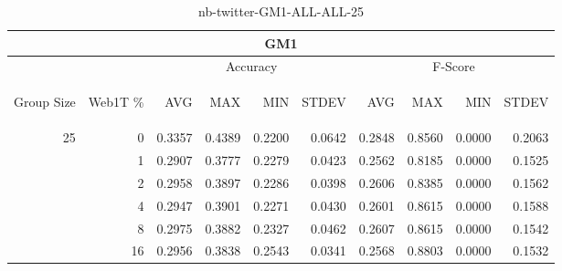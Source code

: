 \begin{center}
\begin{table}[htbp]
\begin{center}
\begin{tabular}{ | r | r | r | r | r | r | r | r | r | r |}
\hline
\multicolumn{10}{|c|}{GM1}\\
\hline
 & & \multicolumn{4}{|c|}{Accuracy} & \multicolumn{4}{|c|}{F-Score}\\ \cline{3-10}
\begin{sideways}Group Size\end{sideways} & \begin{sideways}Web1T \%\end{sideways} & \begin{sideways}AVG\end{sideways} & \begin{sideways}MAX\end{sideways} & \begin{sideways}MIN\end{sideways} & \begin{sideways}STDEV\end{sideways} & \begin{sideways}AVG\end{sideways} & \begin{sideways}MAX\end{sideways} & \begin{sideways}MIN\end{sideways} & \begin{sideways}STDEV\end{sideways}\\
\hline
\multirow{5}{*}{25}
 & 0 & 0.3357 & 0.4389 & 0.2200 & 0.0642 & 0.2848 & 0.8560 & 0.0000 & 0.2063\\ \cline{2-10}
 & 1 & 0.2907 & 0.3777 & 0.2279 & 0.0423 & 0.2562 & 0.8185 & 0.0000 & 0.1525\\ \cline{2-10}
 & 2 & 0.2958 & 0.3897 & 0.2286 & 0.0398 & 0.2606 & 0.8385 & 0.0000 & 0.1562\\ \cline{2-10}
 & 4 & 0.2947 & 0.3901 & 0.2271 & 0.0430 & 0.2601 & 0.8615 & 0.0000 & 0.1588\\ \cline{2-10}
 & 8 & 0.2975 & 0.3882 & 0.2327 & 0.0462 & 0.2607 & 0.8615 & 0.0000 & 0.1542\\ \cline{2-10}
 & 16 & 0.2956 & 0.3838 & 0.2543 & 0.0341 & 0.2568 & 0.8803 & 0.0000 & 0.1532\\ \cline{2-10}
\hline
\end{tabular}
\caption{nb-twitter-GM1-ALL-ALL-25}
\label{table:nb-twitter-GM1-ALL-ALL-25}
\end{center}
\end{table}
\end{center}

